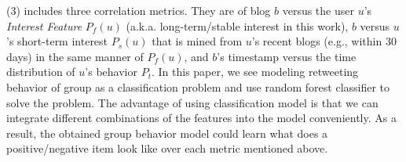 	\stab(3)  includes three correlation metrics. They are of blog $b$ versus the user $u$'s \textit{Interest Feature} $P_f(u)$ (a.k.a. long-term/stable interest in this work), $b$ versus $u$'s short-term interest $P_s(u)$ that is mined from $u$'s recent blogs (e.g., within 30 days) in the same manner of $P_f(u)$, and $b$'s timestamp versus the time distribution of $u$'s \retg{} behavior $P_t$.
In this paper, we see modeling retweeting behavior of group as a classification problem and use random forest classifier to solve the problem. The advantage of using classification model is that we can integrate different combinations of the features into the model conveniently. As a result, the obtained group behavior model could learn what does a positive/negative item look like over each metric mentioned above.\par











